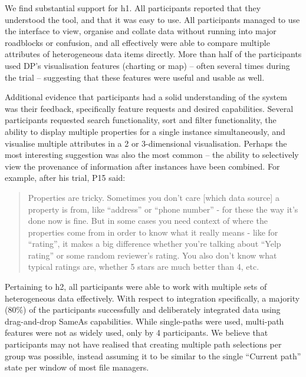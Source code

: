 \documentclass{sigchi}
\begin{document}
We find substantial support for h1. All participants reported that they understood the tool, and that it was easy to use.   All participants managed to use the interface to view, organise and collate data without running into major roadblocks or confusion, and all effectively were able to compare multiple attributes of heterogeneous data items directly.  More than half of the participants used DP's visualisation features (charting or map) -- often several times during the trial -- suggesting that these features were useful and usable as well.  

Additional evidence that participants had a solid understanding of the system was their feedback, specifically feature requests and desired capabilities.  Several participants requested search functionality, sort and filter functionality, the ability to display multiple properties for a single instance simultaneously, and visualise multiple attributes in a 2 or 3-dimensional visualisation.  Perhaps the most interesting suggestion was also the most common -- the ability to selectively view the provenance of information after instances have been combined.  For example, after his trial, P15 said:

\begin{quote}
Properties are tricky. Sometimes you don't care [which data source] a property is from, like ``address'' or ``phone number'' - for these the way it's done now is fine. But in some cases you need context of where the properties come from in order to know what it really means - like for ``rating'', it makes a big difference whether you're talking about ``Yelp rating'' or some random reviewer's rating.  You also don't know what typical ratings are, whether 5 stars are much better than 4, etc.
\end{quote}

Pertaining to h2, all participants were able to work with multiple sets of heterogeneous data effectively.  With respect to integration specifically, a majority (80\%) of the participants successfully and deliberately integrated data using drag-and-drop SameAs capabilities.  While single-paths were used, multi-path features were not as widely used, only by 4 participants. We believe that participants may not have realised that creating multiple path selections per group was possible, instead assuming it to be similar to the single ``Current path'' state per window of most file managers. 
\end{document}
